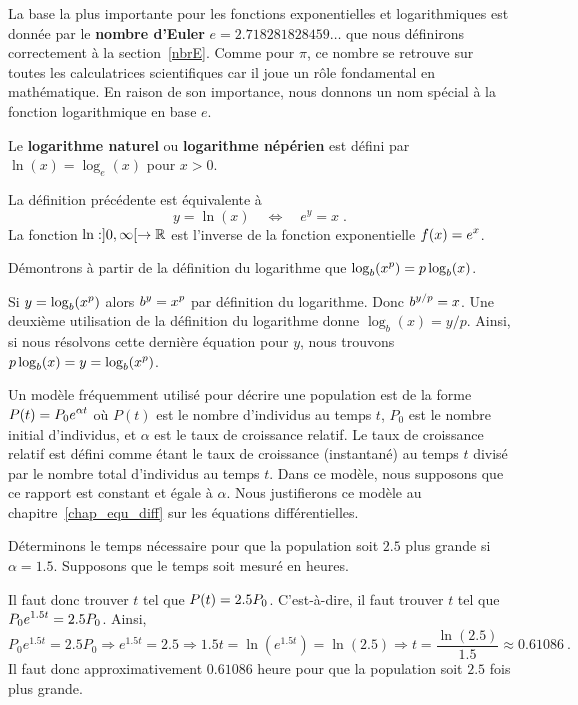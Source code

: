 {La base la plus importante pour les fonctions exponentielles et
logarithmiques est donnée par le {\bfseries nombre d'Euler}
$e = 2.718281828459\ldots$ que nous définirons correctement à la
section~\ref{nbrE}.  Comme pour $\pi$, ce nombre se retrouve sur
toutes les calculatrices scientifiques car il joue un rôle fondamental
en mathématique.  En raison de son importance, nous donnons un nom spécial
à la fonction logarithmique en base $e$.

\begin{defn} 
Le {\bfseries logarithme naturel} ou {\bfseries logarithme népérien}
est défini par $\ln(x) = \log_e(x)$ pour $x>0$.
\end{defn}

La définition précédente est équivalente à
\[
y=\ln(x) \quad \Leftrightarrow \quad e^y = x \; .
\]
La fonction $\ln:]0,\infty[\rightarrow \mathbb{R}$ est l'inverse de la fonction
exponentielle $\displaystyle f(x) = e^x$.

\begin{egg}
Démontrons à partir de la définition du logarithme que
$\displaystyle \log_b(x^p) = p \log_b(x)$.

Si $\displaystyle y = \log_b(x^p)$ alors $\displaystyle b^y = x^p$ par définition du logarithme.
Donc $\displaystyle b^{y/p} = x$.  Une deuxième utilisation de la définition du
logarithme donne $\log_b(x) = y/p$.  Ainsi, si nous résolvons cette
dernière équation pour $y$, nous trouvons
$\displaystyle p\log_b(x) = y = \log_b(x^p)$.
\end{egg}

\begin{egg}
Un modèle fréquemment utilisé pour décrire une population est de la
forme $\displaystyle P(t) = P_0 e^{\alpha t}$ où $P(t)$ est le nombre d'individus au
temps $t$, $P_0$ est le nombre initial d'individus, et $\alpha$ est le
\lgm taux de croissance relatif\rgm.  Le taux de croissance relatif
est défini comme étant le taux de croissance (instantané) au temps $t$
divisé par le nombre total d'individus au temps $t$.  Dans ce modèle,
nous supposons que ce rapport est constant et égale à $\alpha$.  Nous
justifierons ce modèle au chapitre~\ref{chap_equ_diff} sur les équations
différentielles.

Déterminons le temps nécessaire pour que la population soit
$2.5$ plus grande si $\alpha =1.5$.  Supposons que le temps soit
mesuré en heures.

Il faut donc trouver $t$ tel que $\displaystyle P(t) = 2.5 P_0$.
C'est-à-dire, il faut trouver $t$ tel que
$\displaystyle P_0 e^{1.5 t}  = 2.5 P_0$.  Ainsi,
\[
P_0 e^{1.5 t}  = 2.5 P_0 \Rightarrow e^{1.5 t}  = 2.5
\Rightarrow 1.5 t = \ln\left( e^{1.5 t} \right) = \ln(2.5)
\Rightarrow t = \frac{\ln(2.5)}{1.5} \approx 0.61086 \ .
\]
Il faut donc approximativement $0.61086$ heure pour que la population
soit $2.5$ fois plus grande.


\end{egg}}
